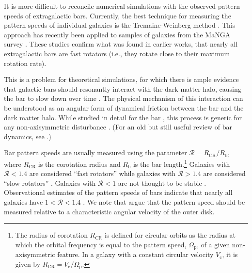 \documentclass[twocolumn,linenumbers,trackchanges]{aastex631}
\newcommand{\RCR}{\ensuremath{R_{\textrm{CR}}}}
\newcommand{\Rot}{\ensuremath{\mathcal{R}}}
\newcommand{\Vc}{\ensuremath{V_{\textrm{c}} }}
\newcommand{\PS}{\ensuremath{\Omega_{\textrm{p}}}}
\newcommand{\Rb}{\ensuremath{R_{\textrm{b}}}}
\begin{document}
It is more difficult to reconcile numerical simulations with the observed
pattern speeds of extragalactic bars. Currently, the best technique for
measuring the pattern speeds of individual galaxies is the Tremaine-Weinberg
method \citep{1984ApJ...282L...5T, 2011MSAIS..18...23C}. This approach has
recently been applied to samples of galaxies from the MaNGA survey
\citep{2019MNRAS.482.1733G, 2020MNRAS.491.3655G}. These studies confirm
what was found in earlier works, that nearly all extragalactic bars are fast
rotators (i.e., they rotate close to their maximum rotation rate).

This is a problem for theoretical simulations, for which there is ample evidence
that galactic bars should resonantly interact with the dark matter halo, causing
the bar to slow down over time \citep{1981AA....96..164C, 1992ApJ...400...80H,
2000ApJ...543..704D, 2002MNRAS.330...35A, 2002ApJ...569L..83A,
2003MNRAS.341.1179A, 2003MNRAS.346..251O, 2005MNRAS.363..991H,
2006ApJ...637..214M, 2007MNRAS.375..460W, 2009ApJ...697..293D}. The physical
mechanism of this interaction can be understood as an angular form of dynamical
friction between the bar and the dark matter halo. While studied in detail for
the bar \citep{1984MNRAS.209..729T, 1985MNRAS.213..451W}, this process is
generic for any non-axisymmetric disturbance \citep{1972MNRAS.157....1L}. (For
an old but still useful review of bar dynamics, see
\citet{1993RPPh...56..173S}.)

Bar pattern speeds are usually measured using the parameter $\Rot=\RCR/\Rb$,
where \RCR{} is the corotation radius and \Rb{} is the bar length.\footnote{The
radius of corotation \RCR{} is defined for circular orbits as the radius at
which the orbital frequency is equal to the pattern speed, \PS{}, of a given
non-axisymmetric feature. In a galaxy with a constant circular velocity \Vc{},
it is given by $\RCR = \Vc / \PS$.} Galaxies with $\Rot < 1.4$ are considered
``fast rotators'' while galaxies with $\Rot > 1.4$ are considered ``slow
rotators'' \citep{2000ApJ...543..704D}. Galaxies with $\Rot < 1$ are not thought
to be stable \citep{1980AA....81..198C}. Observational estimates of the pattern
speeds of bars indicate that nearly all galaxies have $1 < \Rot < 1.4$
\citep{2011MSAIS..18...23C, 2015AA...576A.102A, 2019MNRAS.482.1733G,
2020MNRAS.491.3655G}. We note that \citet{2017ApJ...835..279F} argue that the
pattern speed should be measured relative to a characteristic angular velocity
of the outer disk.
\end{document}

